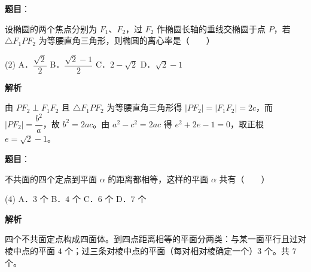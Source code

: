 \begin{answer}

\textbf{题目}：

设椭圆的两个焦点分别为 $F_1$、$F_2$，过 $F_2$ 作椭圆长轴的垂线交椭圆于点 $P$，若 $\triangle F_1PF_2$ 为等腰直角三角形，则椭圆的离心率是\mbox{（　　）}

\begin{gkopts}(2)
\task A．$\dfrac{\sqrt{2}}{2}$
\task B．$\dfrac{\sqrt{2} - 1}{2}$
\task C．$2 - \sqrt{2}$
\task D．$\sqrt{2} - 1$
\end{gkopts}

\textbf{解析}

由 $PF_2 \perp F_1F_2$ 且 $\triangle F_1PF_2$ 为等腰直角三角形得 $|PF_2| = |F_1F_2| = 2c$，而 $|PF_2| = \dfrac{b^2}{a}$，故 $b^2 = 2ac$。由 $a^2 - c^2 = 2ac$ 得 $e^2 + 2e - 1 = 0$，取正根 $e = \sqrt{2} - 1$。


\end{answer}
\begin{answer}

\textbf{题目}：

不共面的四个定点到平面 $\alpha$ 的距离都相等，这样的平面 $\alpha$ 共有\mbox{（　　）}

\begin{gkopts}(4)
\task A．$3$ 个
\task B．$4$ 个
\task C．$6$ 个
\task D．$7$ 个
\end{gkopts}

\textbf{解析}

四个不共面定点构成四面体。到四点距离相等的平面分两类：与某一面平行且过对棱中点的平面 $4$ 个；过三条对棱中点的平面（每对相对棱确定一个）$3$ 个。共 $7$ 个。


\end{answer}

